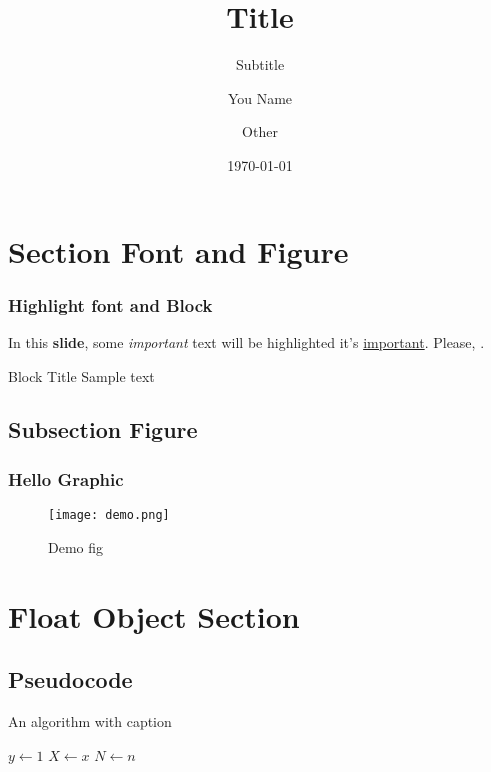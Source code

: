 \documentclass[13pt]{beamer}
\title{Title}
\subtitle{Subtitle}
\author{You Name\inst{1} \and Other\inst{2}}
\institute[Major]
{
  \inst{1}
  School of xxx\\
  xxx University
}
\date{\today}
\begin{document}
\frame{\titlepage}

\begin{frame}
  \tableofcontents[sectionstyle=show,subsectionstyle=show/shaded/hide,subsubsectionstyle=show/shaded/hide]
\end{frame}

\section{Section Font and Figure}

\begin{frame}
\frametitle{Highlight font and Block}
In this \textbf{slide}, some \textit{important} text will be
\alert{highlighted}  it's \underline{important}.
Please, .
  \begin{block}{Block Title}
    Sample text
  \end{block}
\end{frame}

\subsection{Subsection Figure}

\begin{frame}
  \frametitle{Hello Graphic}
  \begin{figure}
    \centering
    \texttt{[image: demo.png]}
    \caption{Demo fig}
    \label{fig:demp} 
  \end{figure}
\end{frame}

\section{Float Object Section}

\subsection{Pseudocode}

\begin{frame}
  \begin{algorithm}[H]
  \footnotesize
  \caption{An algorithm with caption}\label{alg:cap}
$y \gets 1$\;
$X \gets x$\;
$N \gets n$\;
  \end{algorithm}
\end{frame}
\end{document}
